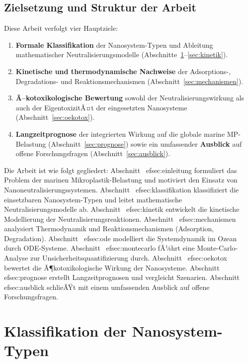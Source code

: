 ﻿\documentclass[12pt,a4paper]{article}
\theoremstyle{definition}
\theoremstyle{remark}
\begin{document}
\subsection{Zielsetzung und Struktur der Arbeit}

Diese Arbeit verfolgt vier Hauptziele:
\begin{enumerate}
\item \textbf{Formale Klassifikation} der Nanosystem-Typen und Ableitung
     mathematischer Neutralisierungsmodelle (Abschnitte~\ref{sec:klassifikation}--\ref{sec:kinetik}).
\item \textbf{Kinetische und thermodynamische Nachweise} der Adsorptions-,
     Degradations- und Reaktionsmechanismen (Abschnitt~\ref{sec:mechanismen}).
\item \textbf{Ã–kotoxikologische Bewertung} sowohl der Neutralisierungswirkung als
     auch der EigentoxizitÃ¤t der eingesetzten Nanosysteme (Abschnitt~\ref{sec:oekotox}).
\item \textbf{Langzeitprognose} der integrierten Wirkung auf die globale marine
     MP-Belastung (Abschnitt~\ref{sec:prognose}) sowie ein umfassender
     \textbf{Ausblick} auf offene Forschungsfragen (Abschnitt~\ref{sec:ausblick}).
\end{enumerate}

Die Arbeit ist wie folgt gegliedert: Abschnitt~
ef{sec:einleitung} formuliert das Problem der marinen Mikroplastik-Belastung und motiviert den Einsatz von Nanoneutralisierungssystemen. Abschnitt~
ef{sec:klassifikation} klassifiziert die einsetzbaren Nanosystem-Typen und leitet mathematische Neutralisierungsmodelle ab. Abschnitt~
ef{sec:kinetik} entwickelt die kinetische Modellierung der Neutralisierungsreaktionen. Abschnitt~
ef{sec:mechanismen} analysiert Thermodynamik und Reaktionsmechanismen (Adsorption, Degradation). Abschnitt~
ef{sec:ode} modelliert die Systemdynamik im Ozean durch ODE-Systeme. Abschnitt~
ef{sec:montecarlo} fÃ¼hrt eine Monte-Carlo-Analyse zur Unsicherheitsquantifizierung durch. Abschnitt~
ef{sec:oekotox} bewertet die Ã¶kotoxikologische Wirkung der Nanosysteme. Abschnitt~
ef{sec:prognose} erstellt Langzeitprognosen und vergleicht Szenarien. Abschnitt~
ef{sec:ausblick} schlieÃŸt mit einem umfassenden Ausblick auf offene Forschungsfragen.

\section{Klassifikation der Nanosystem-Typen}
\label{sec:klassifikation}
\end{document}
